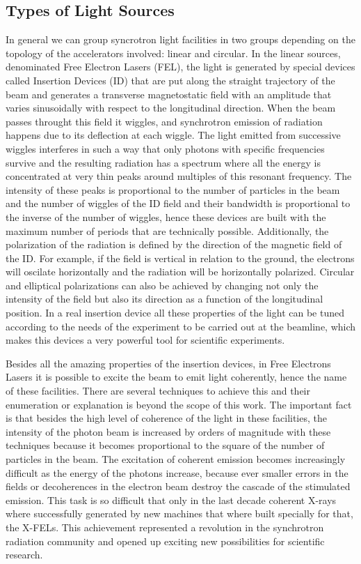 \documentclass[
	12pt,				%
	openright,			%
	oneside,			%
	a4paper,		%
	chapter=TITLE,		%
	section=TITLE,		%
    brazil,				%
	english,			%
	sumario=tradicional,
	]{abntex2}
\begin{document}
    \subsection{Types of Light Sources}

    In general we can group syncrotron light facilities in two groups depending on the topology of the accelerators involved: linear and circular. In the linear sources, denominated Free Electron Lasers (FEL), the light is generated by special devices called Insertion Devices (ID) that are put along the straight trajectory of the beam and generates a transverse magnetostatic field with an amplitude that varies sinusoidally with respect to the longitudinal direction. When the beam passes throught this field it wiggles, and synchrotron emission of radiation happens due to its deflection at each wiggle. The light emitted from successive wiggles interferes in such a way that only photons with specific frequencies survive and the resulting radiation has a spectrum where all the energy is concentrated at very thin peaks around multiples of this resonant frequency. The intensity of these peaks is proportional to the number of particles in the beam and the number of wiggles of the ID field and their bandwidth is proportional to the inverse of the number of wiggles, hence these devices are built with the maximum number of periods that are technically possible. Additionally, the polarization of the radiation is defined by the direction of the magnetic field of the ID. For example, if the field is vertical in relation to the ground, the electrons will oscilate horizontally and the radiation will be horizontally polarized. Circular and elliptical polarizations can also be achieved by changing not only the intensity of the field but also its direction as a function of the longitudinal position. In a real insertion device all these properties of the light can be tuned according to the needs of the experiment to be carried out at the beamline, which makes this devices a very powerful tool for scientific experiments.

    Besides all the amazing properties of the insertion devices, in Free Electrons Lasers it is possible to excite the beam to emit light coherently, hence the name of these facilities. There are several techniques to achieve this and their enumeration or explanation is beyond the scope of this work. The important fact is that besides the high level of coherence of the light in these facilities, the intensity of the photon beam is increased by orders of magnitude with these techniques because it becomes proportional to the square of the number of particles in the beam. The excitation of coherent emission becomes increasingly difficult as the energy of the photons increase, because ever smaller errors in the fields or decoherences in the electron beam destroy the cascade of the stimulated emission. This task is so difficult that only in the last decade coherent X-rays where successfully generated by new machines that where built specially for that, the X-FELs. This achievement represented a revolution in the synchrotron radiation community and opened up exciting new possibilities for scientific research.
\end{document}
